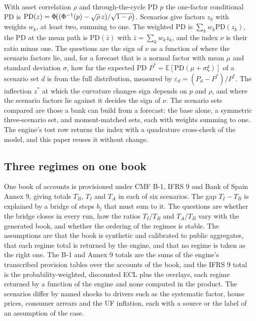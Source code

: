 With asset correlation $\rho$ and through-the-cycle PD $p$ the one-factor conditional PD is $\mathrm{PD}(z)=\Phi\!\big((\Phi^{-1}(p)-\sqrt{\rho}\,z)/\sqrt{1-\rho}\big)$.
Scenarios give factors $z_k$ with weights $w_k$, at least two, summing to one.
The weighted PD is $\sum_k w_k\mathrm{PD}(z_k)$, the PD at the mean path is $\mathrm{PD}(\bar z)$ with $\bar z=\sum_k w_kz_k$, and the index $\nu$ is their ratio minus one.
The questions are the sign of $\nu$ as a function of where the scenario factors lie, and, for a forecast that is a normal factor with mean $\mu$ and standard deviation $\sigma$, how far the expected PD $P^{*}=\mathbb{E}[\mathrm{PD}(\mu+\sigma\xi)]$ of a scenario set $d$ is from the full distribution, measured by $\varepsilon_d=(P_d-P^{*})/P^{*}$.
The inflection $z^{*}$ at which the curvature changes sign depends on $p$ and $\rho$, and where the scenario factors lie against it decides the sign of $\nu$.
The scenario sets compared are those a bank can build from a forecast: the base alone, a symmetric three-scenario set, and moment-matched sets, each with weights summing to one.
The engine's test row returns the index with a quadrature cross-check of the model, and this paper reuses it without change.

\subsection{Three regimes on one book}
\label{sec:problem-regimes}

One book of accounts is provisioned under CMF B-1, IFRS 9 and Bank of Spain Annex 9, giving totals $T_B$, $T_I$ and $T_A$ in each of six scenarios.
The gap $T_I-T_B$ is explained by a bridge of steps $b_j$ that must sum to it.
The questions are whether the bridge closes in every run, how the ratios $T_I/T_B$ and $T_A/T_B$ vary with the generated book, and whether the ordering of the regimes is stable.
The assumptions are that the book is synthetic and calibrated to public aggregates, that each regime total is returned by the engine, and that no regime is taken as the right one.
The B-1 and Annex 9 totals are the sums of the engine's transcribed provision tables over the accounts of the book, and the IFRS 9 total is the probability-weighted, discounted ECL plus the overlays, each regime returned by a function of the engine and none computed in the product.
The scenarios differ by named shocks to drivers such as the systematic factor, house prices, consumer arrears and the UF inflation, each with a source or the label of an assumption of the case.
